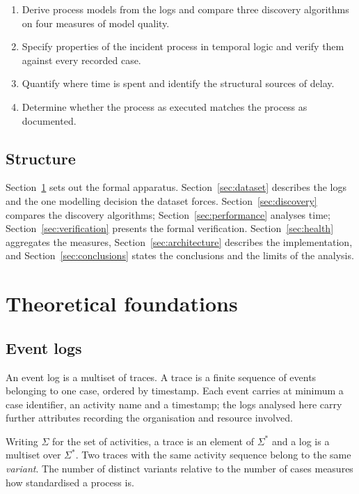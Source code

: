 \documentclass[12pt,a4paper]{article}
\begin{document}
\begin{enumerate}
  \item Derive process models from the logs and compare three discovery
        algorithms on four measures of model quality.
  \item Specify properties of the incident process in temporal logic and verify
        them against every recorded case.
  \item Quantify where time is spent and identify the structural sources of
        delay.
  \item Determine whether the process as executed matches the process as
        documented.
\end{enumerate}

\subsection{Structure}

Section~\ref{sec:foundations} sets out the formal apparatus. Section~\ref{sec:dataset}
describes the logs and the one modelling decision the dataset forces.
Section~\ref{sec:discovery} compares the discovery algorithms;
Section~\ref{sec:performance} analyses time; Section~\ref{sec:verification}
presents the formal verification. Section~\ref{sec:health} aggregates the
measures, Section~\ref{sec:architecture} describes the implementation, and
Section~\ref{sec:conclusions} states the conclusions and the limits of the
analysis.

\section{Theoretical foundations}\label{sec:foundations}

\subsection{Event logs}

An event log is a multiset of traces. A trace is a finite sequence of events
belonging to one case, ordered by timestamp. Each event carries at minimum a
case identifier, an activity name and a timestamp; the logs analysed here carry
further attributes recording the organisation and resource involved.

Writing $\Sigma$ for the set of activities, a trace is an element of $\Sigma^*$
and a log is a multiset over $\Sigma^*$. Two traces with the same activity
sequence belong to the same \emph{variant}. The number of distinct variants
relative to the number of cases measures how standardised a process is.
\end{document}
